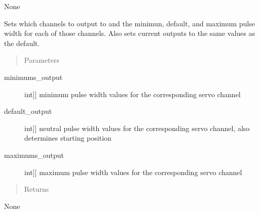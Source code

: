 \documentclass[letterpaper,10pt,english]{sphinxmanual}
\begin{document}
\begin{fulllineitems}
\begin{fulllineitems}
\sphinxAtStartPar
None

\end{fulllineitems}


\begin{fulllineitems}
\label{\detokenize{base:OutputObject.OutputObject.set_outputs}}
\sphinxAtStartPar
Sets which channels to output to and the minimun, default, and maximum pulse width for each of those channels.
Also sets current outputs to the same values as the default.
\begin{quote}\begin{description}
\item[{Parameters}] \leavevmode
\end{description}\end{quote}
\begin{description}
\item[{minimums\_output}] \leavevmode{[}{[}int{]}{]}
\sphinxAtStartPar
minimum pulse width values for the corresponding servo channel

\item[{default\_output}] \leavevmode{[}{[}int{]}{]}
\sphinxAtStartPar
neutral pulse width values for the corresponding servo channel, also determines starting position

\item[{maximums\_output}] \leavevmode{[}{[}int{]}{]}
\sphinxAtStartPar
maximum pulse width values for the corresponding servo channel

\end{description}
\begin{quote}\begin{description}
\item[{Returns}] \leavevmode
\end{description}\end{quote}

\sphinxAtStartPar
None

\end{fulllineitems}


\end{fulllineitems}

\end{document}
